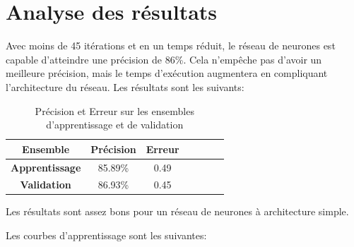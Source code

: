 \documentclass[a4paper,english,12pt]{article}
\begin{document}
\section{Analyse des résultats}
Avec moins de 45 itérations et en un temps réduit, le réseau de neurones est capable d'atteindre une précision de 86\%. Cela n'empêche pas d'avoir un meilleure précision, mais le temps d'exécution augmentera en compliquant l'architecture du réseau. Les résultats sont les suivants:

\begin{table}[H]\centering
	\begin{tabular}{ccccccc}
		\toprule \textbf{Ensemble} & \textbf{Précision} & \textbf{Erreur}\\    \midrule
		\textbf{Apprentissage} & 85.89\% & 0.49
		\\    \midrule
		\textbf{Validation} & 86.93\% & 0.45  \\   
		\bottomrule	
	\end{tabular}
	\caption{Précision et Erreur sur les ensembles d'apprentissage et de validation\label{tab1}}
\end{table}

Les résultats sont assez bons pour un réseau de neurones à architecture simple.

\vspace{20em}

Les courbes d'apprentissage sont les suivantes:
\end{document}
